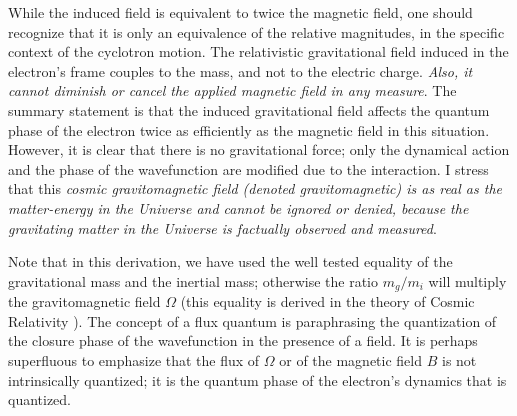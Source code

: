 \documentclass[aps,preprint,12pt,tightenlines]{revtex4}%
\begin{document}
While the induced field is equivalent to twice the magnetic field, one should
recognize that it is only an equivalence of the relative magnitudes, in the
specific context of the cyclotron motion. The relativistic gravitational field
induced in the electron's frame couples to the mass, and not to the electric
charge. \emph{Also, it cannot diminish or cancel the applied magnetic field in
any measure}. The summary statement is that the induced gravitational field
affects the quantum phase of the electron twice as efficiently as the magnetic
field in this situation. However, it is clear that there is no gravitational
force; only the dynamical action and the phase of the wavefunction are
modified due to the interaction. I stress that this \emph{cosmic
gravitomagnetic field (denoted gravitomagnetic) is as real as the
matter-energy in the Universe and cannot be ignored or denied, because the
gravitating matter in the Universe is factually observed and measured}.

Note that in this derivation, we have used the well tested equality of the
gravitational mass and the inertial mass; otherwise the ratio $m_{g}/m_{i}$
will multiply the gravitomagnetic field $\Omega$ (this equality is derived in
the theory of Cosmic Relativity \cite{Unni-WAG}). The concept of a flux
quantum is paraphrasing the quantization of the closure phase of the
wavefunction in the presence of a field. It is perhaps superfluous to
emphasize that the flux of $\Omega$ or of the magnetic field $B$ is not intrinsically quantized; it
is the quantum phase of the electron's dynamics that is quantized.
\end{document}
